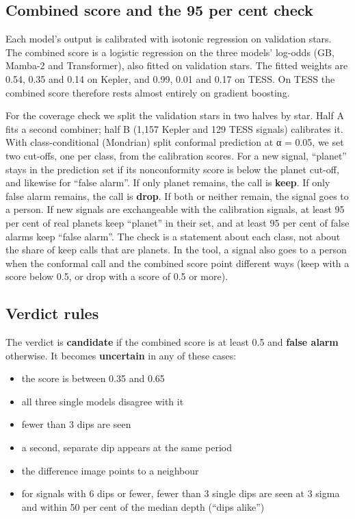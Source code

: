 \documentclass[fleqn,usenatbib]{mnras}
\providecommand{\tightlist}{\setlength{\itemsep}{0pt}\setlength{\parskip}{0pt}}
\begin{document}
\subsection{Combined score and the 95 per cent check}

Each model's output is calibrated with isotonic regression on validation stars. The combined score is a logistic regression on the three models' log-odds (GB, Mamba-2 and Transformer), also fitted on validation stars. The fitted weights are 0.54, 0.35 and 0.14 on Kepler, and 0.99, 0.01 and 0.17 on TESS. On TESS the combined score therefore rests almost entirely on gradient boosting.

For the coverage check we split the validation stars in two halves by star. Half A fits a second combiner; half B (1,157 Kepler and 129 TESS signals) calibrates it. With class-conditional (Mondrian) split conformal prediction at α = 0.05, we set two cut-offs, one per class, from the calibration scores. For a new signal, ``planet'' stays in the prediction set if its nonconformity score is below the planet cut-off, and likewise for ``false alarm''. If only planet remains, the call is \textbf{keep}. If only false alarm remains, the call is \textbf{drop}. If both or neither remain, the signal goes to a person. If new signals are exchangeable with the calibration signals, at least 95 per cent of real planets keep ``planet'' in their set, and at least 95 per cent of false alarms keep ``false alarm''. The check is a statement about each class, not about the share of keep calls that are planets. In the tool, a signal also goes to a person when the conformal call and the combined score point different ways (keep with a score below 0.5, or drop with a score of 0.5 or more).

\subsection{Verdict rules}

The verdict is \textbf{candidate} if the combined score is at least 0.5 and \textbf{false alarm} otherwise. It becomes \textbf{uncertain} in any of these cases:

\begin{itemize}
\tightlist
\item
  the score is between 0.35 and 0.65
\item
  all three single models disagree with it
\item
  fewer than 3 dips are seen
\item
  a second, separate dip appears at the same period
\item
  the difference image points to a neighbour
\item
  for signals with 6 dips or fewer, fewer than 3 single dips are seen at 3 sigma and within 50 per cent of the median depth (``dips alike'')
\end{itemize}
\end{document}
